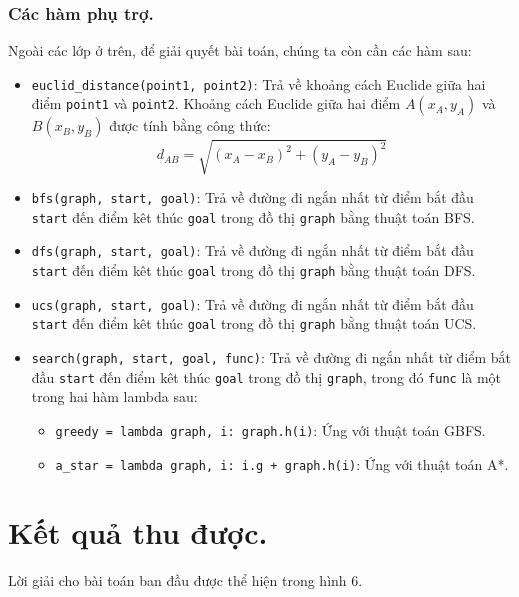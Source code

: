 \documentclass[a4paper, 11pt]{article}
\begin{document}
\subsubsection{Các hàm phụ trợ.}
Ngoài các lớp ở trên, để giải quyết bài toán, chúng ta còn cần các hàm sau:
\begin{itemize}
  \item \lstinline|euclid_distance(point1, point2)|: Trả về khoảng cách Euclide giữa hai điểm \lstinline|point1| và \lstinline|point2|. Khoảng cách Euclide giữa hai điểm $A(x_A, y_A)$ và $B(x_B, y_B)$ được tính bằng công thức:
  \begin{equation}
    d_{AB} = \sqrt{(x_A - x_B)^2 + (y_A - y_B)^2}\nonumber
  \end{equation}
  \item \lstinline|bfs(graph, start, goal)|: Trả về đường đi ngắn nhất từ điểm bắt đầu \lstinline|start| đến điểm kêt thúc \lstinline|goal| trong đồ thị \lstinline|graph| bằng thuật toán BFS.
  \item \lstinline|dfs(graph, start, goal)|: Trả về đường đi ngắn nhất từ điểm bắt đầu \lstinline|start| đến điểm kêt thúc \lstinline|goal| trong đồ thị \lstinline|graph| bằng thuật toán DFS.
  \item \lstinline|ucs(graph, start, goal)|: Trả về đường đi ngắn nhất từ điểm bắt đầu \lstinline|start| đến điểm kêt thúc \lstinline|goal| trong đồ thị \lstinline|graph| bằng thuật toán UCS.
  \item \lstinline|search(graph, start, goal, func)|: Trả về đường đi ngắn nhất từ điểm bắt đầu \lstinline|start| đến điểm kêt thúc \lstinline|goal| trong đồ thị \lstinline|graph|, trong đó \lstinline|func| là một trong hai hàm lambda sau:
  \begin{itemize}
    \item \lstinline|greedy = lambda graph, i: graph.h(i)|: Ứng với thuật toán GBFS.
    \item \lstinline|a_star = lambda graph, i: i.g + graph.h(i)|: Ứng với thuật toán A*.
  \end{itemize}
\end{itemize}

\clearpage
\section{Kết quả thu được.}
Lời giải cho bài toán ban đầu được thể hiện trong hình 6.
\end{document}
